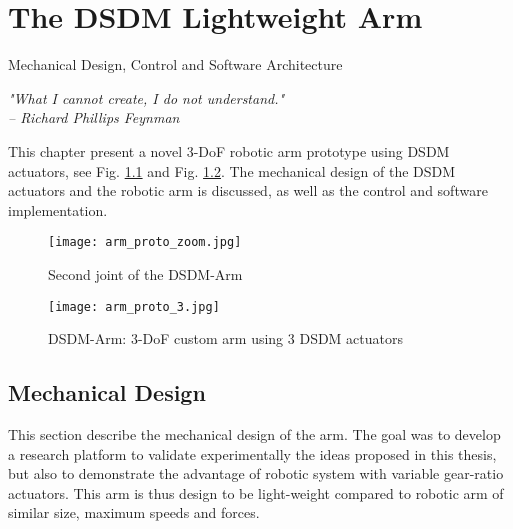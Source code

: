 \chapter{The DSDM Lightweight Arm }
\label{sec:ExperimentalValidation}

\vspace{-5pt}
{ \Large Mechanical Design, Control and Software Architecture }

{
\begin{flushright}
\textit{"What I cannot create, I do not understand."} \\ 
\emph{-- Richard Phillips Feynman}
\end{flushright}
}
\vspace{10pt}



This chapter present a novel 3-DoF robotic arm prototype using DSDM actuators, see Fig. \ref{fig:dsdm_arm_zoom} and Fig. \ref{fig:dsdm_arm}. The mechanical design of the DSDM actuators and the robotic arm is discussed, as well as the control and software implementation.

\begin{figure}[htb]
	\centering
		\texttt{[image: arm\_proto\_zoom.jpg]}
	\caption{Second joint of the DSDM-Arm}
	\label{fig:dsdm_arm_zoom}
\end{figure}

\begin{figure}[htp]
	\centering
		\texttt{[image: arm\_proto\_3.jpg]}
	\caption{DSDM-Arm: 3-DoF custom arm using 3 DSDM actuators}
	\label{fig:dsdm_arm}
\end{figure}

\section{Mechanical Design}

This section describe the mechanical design of the arm. The goal was to develop a research platform to validate experimentally the ideas proposed in this thesis, but also to demonstrate the advantage of robotic system with variable gear-ratio actuators. This arm is thus design to be light-weight compared to robotic arm of similar size, maximum speeds and forces. 

